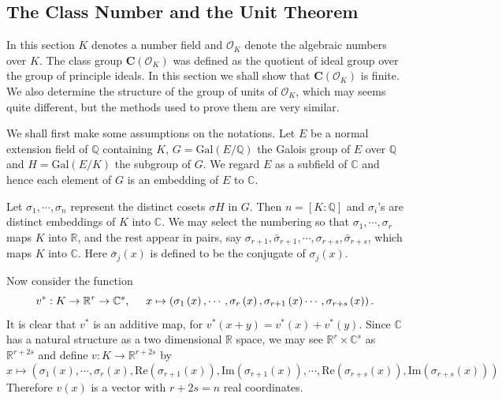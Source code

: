 \subsection{The Class Number and the Unit Theorem}
In this section $K$ denotes a number field and $\mathcal{O}_K$ denote the algebraic numbers over $K$. The class group $\mathbf{C}(\mathcal{O}_K)$ was defined as the quotient of ideal group over the group of principle ideals. In this section we shall show that $\mathbf{C}(\mathcal{O}_K)$ is finite. We also determine the structure of the group of units of $\mathcal{O}_K$, which may seems quite different, but the methods used to prove them are very similar.\par
We shall first make some assumptions on the notations. Let $E$ be a normal extension field of $\mathbb{Q}$ containing $K$, $G=\mathrm{Gal}(E/\mathbb{Q})$ the Galois group of $E$ over $\mathbb{Q}$ and $H=\mathrm{Gal}(E/K)$ the subgroup of $G$. We regard $E$ as a subfield of $\mathbb{C}$ and hence each element of $G$ is an embedding of $E$ to $\mathbb{C}$.\par
Let $\sigma_1,\cdots,\sigma_n$ represent the distinct cosets $\sigma H$ in $G$. Then $n=[K:\mathbb{Q}]$ and $\sigma_i$'s are distinct embeddings of $K$ into $\mathbb{C}$. We may select the numbering so that $\sigma_1,\cdots,\sigma_r$ maps $K$ into $\mathbb{R}$, and the rest appear in pairs, say $\sigma_{r+1},\bar{\sigma}_{r+1},\cdots,\sigma_{r+s},\bar{\sigma}_{r+s}$, which maps $K$ into $\mathbb{C}$. Here $\bar{\sigma}_j(x)$ is defined to be the conjugate of $\sigma_j(x)$.\par
Now consider the function 
$$
v^*:K\rightarrow \mathbb{R} ^r\rightarrow \mathbb{C} ^s,\hspace{0.5cm}x\mapsto \left( \sigma _1\left( x \right) ,\cdots ,\sigma _r\left( x \right) ,\sigma _{r+1}\left( x \right) \cdots ,\sigma _{r+s}\left( x \right) \right) .
$$
It is clear that $v^*$ is an additive map, for $v^*(x+y)=v^*(x)+v^*(y)$. Since $\mathbb{C}$ has a natural structure as a two dimensional $\mathbb{R}$ space, we may see $\mathbb{R}^r\times\mathbb{C}^s$ as $\mathbb{R}^{r+2s}$ and define $v:K\to\mathbb{R}^{r+2s}$ by
$$
x\mapsto \left( \sigma _1\left( x \right) ,\cdots ,\sigma _r\left( x \right) ,\mathrm{Re}\left( \sigma _{r+1}\left( x \right) \right) ,\mathrm{Im}\left( \sigma _{r+1}\left( x \right) \right) ,\cdots ,\mathrm{Re}\left( \sigma _{r+s}\left( x \right) \right) ,\mathrm{Im}\left( \sigma _{r+s}\left( x \right) \right) \right) 
$$
Therefore $v(x)$ is a vector with $r+2s=n$ real coordinates.\par
